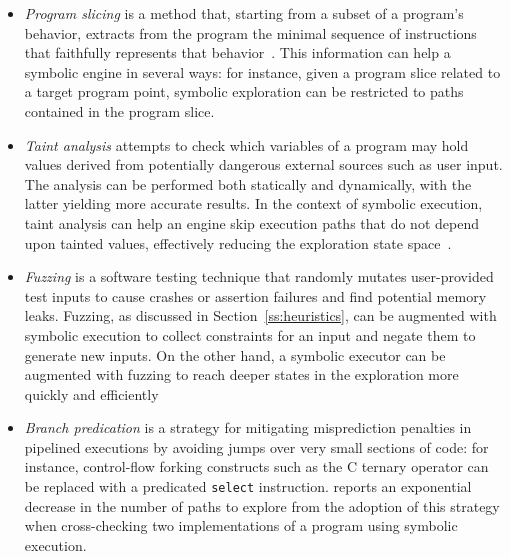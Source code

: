 \begin{itemize}

\item {\em Program slicing} is a method that, starting from a subset of a program's behavior, extracts from the program the minimal sequence of instructions that faithfully represents that behavior~\cite{Weiser84}. This information can help a symbolic engine in several ways: for instance, given a program slice related to a target program point, symbolic exploration can be restricted to paths contained in the program slice. 

\item {\em Taint analysis} attempts to check which variables of a program may hold values derived from potentially dangerous external sources such as user input. The analysis can be performed both statically and dynamically, with the latter yielding more accurate results. In the context of symbolic execution, taint analysis can help an engine skip execution paths that do not depend upon tainted values, effectively reducing the exploration state space~\cite{SAB-SP10}.

\item {\em Fuzzing} is a software testing technique that randomly mutates user-provided test inputs to cause crashes or assertion failures and find potential memory leaks. Fuzzing, as discussed in Section~\ref{ss:heuristics}, can be augmented with symbolic execution to collect constraints for an input and negate them to generate new inputs. On the other hand, a symbolic executor can be augmented with fuzzing to reach deeper states in the exploration more quickly and efficiently

\item {\em Branch predication} is a strategy for mitigating misprediction penalties in pipelined executions by avoiding jumps over very small sections of code: for instance, control-flow forking constructs such as the C ternary operator can be replaced with a predicated {\tt select} instruction. \cite{CCK-EUROSYS11} reports an exponential decrease in the number of paths to explore from the adoption of this strategy when cross-checking two implementations of a program using symbolic execution. %


\end{itemize}
